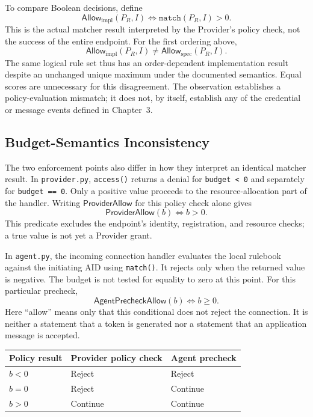 To compare Boolean decisions, define
\[
  \mathsf{Allow}_{\mathrm{impl}}(P_R,I)
  \Longleftrightarrow \mathtt{match}(P_R,I)>0.
\]
This is the actual matcher result interpreted by the Provider's policy
check, not the success of the entire endpoint. For the first ordering above,
\[
  \mathsf{Allow}_{\mathrm{impl}}(P_R,I)
  \neq \mathsf{Allow}_{\mathrm{spec}}(P_R,I).
\]
The same logical rule set thus has an order-dependent implementation result
despite an unchanged unique maximum under the documented semantics. Equal
scores are unnecessary for this disagreement. The observation establishes a
policy-evaluation mismatch; it does not, by itself, establish any of the
credential or message events defined in Chapter~3.


\subsection{Budget-Semantics Inconsistency}

The two enforcement points also differ in how they interpret an identical
matcher result. In \texttt{provider.py}, \texttt{access()} returns a denial for
\texttt{budget < 0} and separately for \texttt{budget == 0}. Only a positive
value proceeds to the resource-allocation part of the handler. Writing
$\mathsf{ProviderAllow}$ for this policy check alone gives
\[
  \mathsf{ProviderAllow}(b) \Longleftrightarrow b>0.
\]
This predicate excludes the endpoint's identity, registration, and resource
checks; a true value is not yet a Provider grant.

In \texttt{agent.py}, the incoming connection handler evaluates the local
rulebook against the initiating AID using \texttt{match()}. It rejects only
when the returned value is negative. The budget is not tested for equality
to zero at this point. For this particular precheck,
\[
  \mathsf{AgentPrecheckAllow}(b) \Longleftrightarrow b\geq0.
\]
Here ``allow'' means only that this conditional does not reject the
connection. It is neither a statement that a token is generated nor a
statement that an application message is accepted.
\begin{center}
\begin{tabular}{lll}
\hline
Policy result & Provider policy check & Agent precheck \\
\hline
$b<0$ & Reject & Reject \\
$b=0$ & Reject & Continue \\
$b>0$ & Continue & Continue \\
\hline
\end{tabular}
\end{center}

